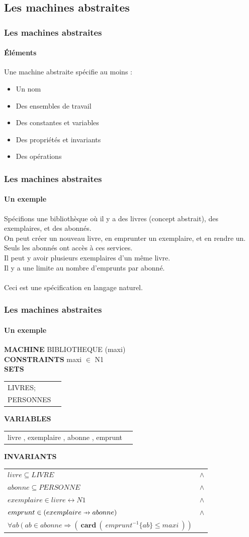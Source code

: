\documentclass[11pt,a4paper,xcolor=table, handout]{beamer} %
\def\p#1{\mathrel{\ooalign{\hfil$\mapstochar\mkern 5mu$\hfil\cr$#1$}}}
\def \pfun  {\p\rightarrow}
\begin{document}
\subsection{Les machines abstraites}
\begin{frame}
\frametitle{Les machines abstraites}
\framesubtitle{Éléments}
Une machine abstraite spécifie au moins :
\begin{itemize}
\pause
\item Un nom
\pause
\item Des ensembles de travail
\pause
\item Des constantes et variables
\pause
\item Des propriétés et invariants
\pause
\item Des opérations
\end{itemize}
\end{frame}

\begin{frame}
\frametitle{Les machines abstraites}
\framesubtitle{Un exemple}
Spécifions une bibliothèque où il y a des livres (concept abstrait), des exemplaires, et des abonnés.\\\pause
On peut créer un nouveau livre, \pause en emprunter un exemplaire, \pause et en rendre un.
\\\pause Seuls les abonnés ont accès à ces services.
\\\pause Il peut y avoir plusieurs exemplaires d'un même livre.
\\\pause Il y a une limite au nombre d'emprunts par abonné.
\\~\\\pause Ceci est une spécification en langage naturel.
\end{frame}

\begin{frame}
\frametitle{Les machines abstraites}
\framesubtitle{Un exemple}
\setlength{\LTpre}{\medskipamount}
\setlength{\LTpost}{0pt}
\setlength\LTleft{\parindent}
\textbf{MACHINE}  BIBLIOTHEQUE (maxi) \\
\noindent\textbf{CONSTRAINTS} maxi $\in$ N1 \\
\noindent\textbf{SETS}
\begin{longtable}{ll} LIVRES; \\ PERSONNES\\ \end{longtable}
\noindent\textbf{VARIABLES}
\begin{longtable}{ll} livre , exemplaire , abonne , emprunt \end{longtable}
\noindent\textbf{INVARIANTS}
\begin{longtable}{ll}
$livre \subseteq LIVRE $ & $\wedge$ \tabularnewline
$abonne \subseteq PERSONNE$ & $\wedge$ \tabularnewline
$exemplaire \in livre \leftrightarrow N1$ & $\wedge$ \tabularnewline
$emprunt \in ( exemplaire \pfun abonne )$ & $\wedge$ \tabularnewline
$\forall ab\ (\ ab \in abonne \Rightarrow (\ \textbf{card}\ (\ emprunt ^{-1}\{ab\} \leq maxi\ ))$ &
\end{longtable}
\end{frame}
\end{document}
